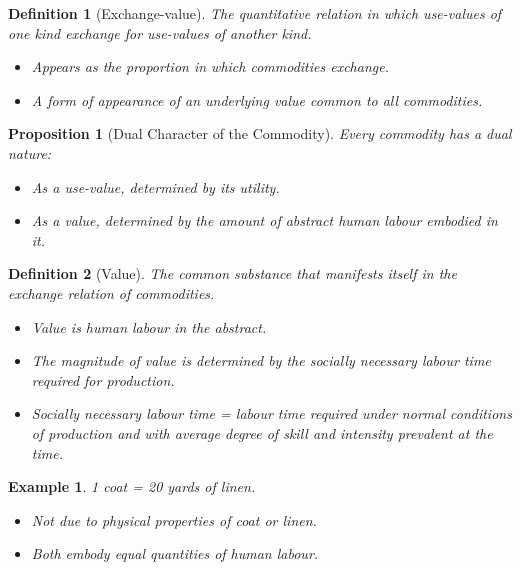 \documentclass{article}
\newtheorem{innerdef}{Definition}
\newtheorem{innerprop}{Proposition}
\newtheorem{innerex}{Example}
\newenvironment{definition}{\begin{innerdef}}{\end{innerdef}}
\newenvironment{proposition}{\begin{innerprop}}{\end{innerprop}}
\newenvironment{example}{\begin{innerex}}{\end{innerex}}
\begin{document}
\begin{definition}[Exchange-value]\label{def:1.1.1.2}
The quantitative relation in which use-values of one kind exchange for use-values of another kind.
\begin{itemize}[noitemsep]
  \item Appears as the proportion in which commodities exchange.
  \item A form of appearance of an underlying value common to all commodities.
\end{itemize}
\end{definition}

\begin{proposition}[Dual Character of the Commodity]\label{prop:1.1.1.1}
Every commodity has a dual nature:
\begin{itemize}[noitemsep]
  \item As a \textit{use-value}, determined by its utility.
  \item As a \textit{value}, determined by the amount of abstract human labour embodied in it.
\end{itemize}
\end{proposition}

\newpage

\begin{definition}[Value]\label{def:1.1.1.3}
The common substance that manifests itself in the exchange relation of commodities.
\begin{itemize}[noitemsep]
  \item Value is human labour in the abstract.
  \item The magnitude of value is determined by the socially necessary labour time required for production.
  \item Socially necessary labour time = labour time required under normal conditions of production and with average degree of skill and intensity prevalent at the time.
\end{itemize}
\end{definition}

\begin{example}
1 coat = 20 yards of linen.
\begin{itemize}[noitemsep]
  \item Not due to physical properties of coat or linen.
  \item Both embody equal quantities of human labour.
\end{itemize}
\end{example}
\end{document}
